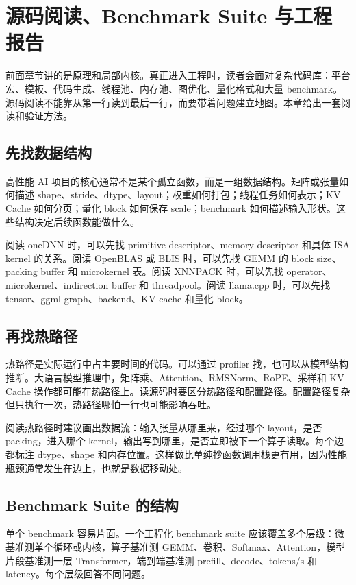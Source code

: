 \chapter{源码阅读、Benchmark Suite 与工程报告}

前面章节讲的是原理和局部内核。真正进入工程时，读者会面对复杂代码库：平台宏、模板、代码生成、线程池、内存池、图优化、量化格式和大量 benchmark。源码阅读不能靠从第一行读到最后一行，而要带着问题建立地图。本章给出一套阅读和验证方法。

\section{先找数据结构}

高性能 AI 项目的核心通常不是某个孤立函数，而是一组数据结构。矩阵或张量如何描述 shape、stride、dtype、layout；权重如何打包；线程任务如何表示；KV Cache 如何分页；量化 block 如何保存 scale；benchmark 如何描述输入形状。这些结构决定后续函数能做什么。

阅读 oneDNN 时，可以先找 primitive descriptor、memory descriptor 和具体 ISA kernel 的关系。阅读 OpenBLAS 或 BLIS 时，可以先找 GEMM 的 block size、packing buffer 和 microkernel 表。阅读 XNNPACK 时，可以先找 operator、microkernel、indirection buffer 和 threadpool。阅读 llama.cpp 时，可以先找 tensor、ggml graph、backend、KV cache 和量化 block。

\section{再找热路径}

热路径是实际运行中占主要时间的代码。可以通过 profiler 找，也可以从模型结构推断。大语言模型推理中，矩阵乘、Attention、RMSNorm、RoPE、采样和 KV Cache 操作都可能在热路径上。读源码时要区分热路径和配置路径。配置路径复杂但只执行一次，热路径哪怕一行也可能影响吞吐。

阅读热路径时建议画出数据流：输入张量从哪里来，经过哪个 layout，是否 packing，进入哪个 kernel，输出写到哪里，是否立即被下一个算子读取。每个边都标注 dtype、shape 和内存位置。这样做比单纯抄函数调用栈更有用，因为性能瓶颈通常发生在边上，也就是数据移动处。

\section{Benchmark Suite 的结构}

单个 benchmark 容易片面。一个工程化 benchmark suite 应该覆盖多个层级：微基准测单个循环或内核，算子基准测 GEMM、卷积、Softmax、Attention，模型片段基准测一层 Transformer，端到端基准测 prefill、decode、tokens/s 和 latency。每个层级回答不同问题。

